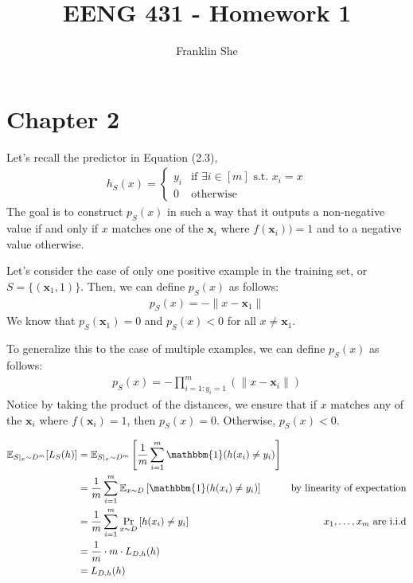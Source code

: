 \documentclass[10pt]{article}
\newcommand{\E}{\mathbb{E}}
\newenvironment{problem}[2][Problem]{\begin{trivlist}
\item[\hskip \labelsep {\bfseries #1}\hskip \labelsep {\bfseries #2.}]}{\end{trivlist}}
\begin{document}
\title{\vspace{-2cm} EENG 431 - Homework 1}
\author{Franklin She}

\maketitle

\section{Chapter 2}
 
\begin{problem}{1}
    Let's recall the predictor in Equation (2.3),
    \begin{align*}
        h_S(x) = \begin{cases}
            y_i & \text{if } \exists i \in [m] \text{ s.t. } x_i = x\\
            0 & \text{otherwise}
        \end{cases}
    \end{align*}
    The goal is to construct $p_S(x)$ in such a way that it outputs a non-negative value if and only if $x$ matches one of the $\mathbf{x}_i$ where $f(\mathbf{x}_i)) = 1$ and to a negative value otherwise.

    Let's consider the case of only one positive example in the training set, or $S = \{(\mathbf{x}_1, 1)\}$. Then, we can define $p_S(x)$ as follows:
    \begin{align*}
        p_S(x) = -  \lVert x - \mathbf{x}_1 \rVert
    \end{align*}
    We know that $p_S(\mathbf{x}_1) = 0$ and $p_S(x) < 0$ for all $x \neq \mathbf{x}_1$.

    To generalize this to the case of multiple examples, we can define $p_S(x)$ as follows:
    \begin{align*}
        p_S(x) = -\prod_{i=1 \colon y_i = 1}^m \left(\lVert x - \mathbf{x}_i \rVert \right)
    \end{align*}
    Notice by taking the product of the distances, we ensure that if $x$ matches any of the $\mathbf{x}_i$ where $f(\mathbf{x}_i) = 1$, then $p_S(x) = 0$. Otherwise, $p_S(x) < 0$.
\end{problem}

\begin{problem}{2}
    \begin{align*}
        \E_{S \mid_x \sim D^m}[L_S(h)] &= \E_{S \mid_x \sim D^m} \left[ \frac{1}{m} \sum_{i=1}^m \mathbbm{1}(h(x_i) \neq y_i) \right] \\
                                       &= \frac{1}{m} \sum_{i=1}^m \E_{x\sim D} \left[ \mathbbm{1}(h(x_i) \neq y_i) \right] & \text{by linearity of expectation}\\
                                       &= \frac{1}{m} \sum_{i=1}^m \Pr_{x\sim D} \left[ h(x_i) \neq y_i \right] & \text{$x_1, \ldots, x_m$ are i.i.d} \\ 
                                       &= \frac{1}{m}\cdot m\cdot  L_{D,h}(h) \\
                                       &= L_{D,h}(h)
    \end{align*}
\end{problem}
\end{document}
